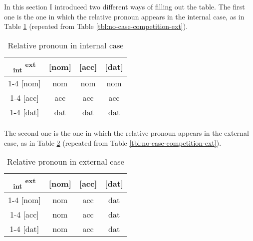 In this section I introduced two different ways of filling out the table. The first one is the one in which the relative pronoun appears in the internal case, as in Table \ref{tbl:no-case-competition-int-typology} (repeated from Table \ref{tbl:no-case-competition-ext}).

\begin{table}[H]
  \center
  \caption{Relative pronoun in internal case}
  \begin{tabular}{c|c|c|c}
    \toprule
   \textsubscript{\ac{int}} \textsuperscript{\ac{ext}}
          & [\ac{nom}]
          & [\ac{acc}]
          & [\ac{dat}]
          \\ \cmidrule{1-4}
      [\ac{nom}]
          & \ac{nom}
          & \ac{nom}
          & \ac{nom}
          \\ \cmidrule{1-4}
      [\ac{acc}]
          & \ac{acc}
          & \ac{acc}
          & \ac{acc}
          \\ \cmidrule{1-4}
      [\ac{dat}]
          & \ac{dat}
          & \ac{dat}
          & \ac{dat}
          \\
    \bottomrule
  \end{tabular}
  \label{tbl:no-case-competition-int-typology}
\end{table}

The second one is the one in which the relative pronoun appears in the external case, as in Table \ref{tbl:no-case-competition-ext-typology} (repeated from Table \ref{tbl:no-case-competition-ext}).

\begin{table}[H]
  \center
  \caption{Relative pronoun in external case}
  \begin{tabular}{c|c|c|c}
    \toprule
   \textsubscript{\ac{int}} \textsuperscript{\ac{ext}}
          & [\ac{nom}]
          & [\ac{acc}]
          & [\ac{dat}]
          \\ \cmidrule{1-4}
      [\ac{nom}]
          & \ac{nom}
          & \ac{acc}
          & \ac{dat}
          \\ \cmidrule{1-4}
      [\ac{acc}]
          & \ac{nom}
          & \ac{acc}
          & \ac{dat}
          \\ \cmidrule{1-4}
      [\ac{dat}]
          & \ac{nom}
          & \ac{acc}
          & \ac{dat}
          \\
    \bottomrule
  \end{tabular}
  \label{tbl:no-case-competition-ext-typology}
\end{table}

